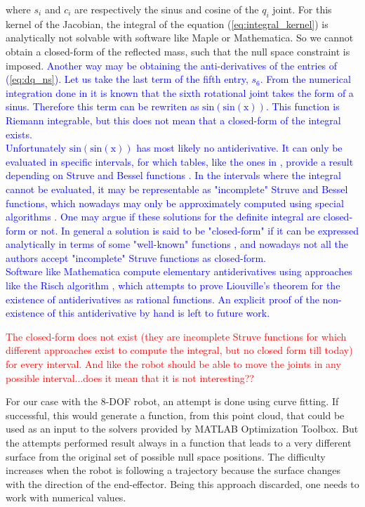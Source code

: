 where $s_i$ and $c_i$ are respectively the sinus and cosine of the $q_i$ joint. For this kernel of the Jacobian, the integral of the equation (\ref{eq:integral_kernel}) is analytically not solvable with software like Maple or Mathematica. So we cannot obtain a closed-form of the reflected mass, such that the null space constraint is imposed. \textcolor{blue}{Another way may be obtaining the anti-derivatives of the entries of (\ref{eq:dq_ns}). Let us take the last term of the fifth entry, $s_6$. From the numerical integration done in  \cite{fabianthesis} it is known that the sixth rotational joint takes the form of a sinus. Therefore this term can be rewriten as $\mathrm{sin(sin(x))}$.  This function is Riemann integrable, but this does not mean that a closed-form of the integral exists. \\
Unfortunately $\mathrm{sin(sin(x))}$ has most likely no antiderivative. It can only be evaluated in specific intervals, for which tables, like the ones in \cite{hanbook_math}, provide a result depending on Struve and Bessel functions \cite{struve}. In the intervals where the integral cannot be evaluated, it may be representable as "incomplete" Struve and Bessel functions, which nowadays may only be approximately computed using special algorithms \cite{incomplete_bessel}. One may argue if these solutions for the definite integral are closed-form or not. In general a solution is said to be "closed-form" if it can be expressed analytically in terms of some "well-known" functions \cite{def_closed_form},  and nowadays not all the authors accept "incomplete" Struve functions as closed-form.  \\
Software like Mathematica compute elementary antiderivatives using approaches like the Risch algorithm \cite{risch}, which attempts to prove Liouville's theorem \cite{lioville} for the existence of antiderivatives as rational functions.  An explicit proof of the non-existence of this antiderivative  by hand is left to future work.}

\textcolor{red}{The closed-form does not exist (they are incomplete Struve functions for which different approaches exist to compute the integral, but no closed form till today) for every interval. And like the robot should be able to move the joints in any possible interval...does it mean that it is not interesting??}





For our case with the 8-DOF robot, an attempt is done using curve fitting. If successful, this would generate a function, from this point cloud, that could be used as an input to the solvers provided by MATLAB Optimization Toolbox. But the attempts performed result always in a function that leads to a very different surface from the original  set of possible null space positions. The difficulty increases when the robot is following a trajectory because the surface changes with the direction of the end-effector. Being this approach discarded, one needs to work with numerical values. 





